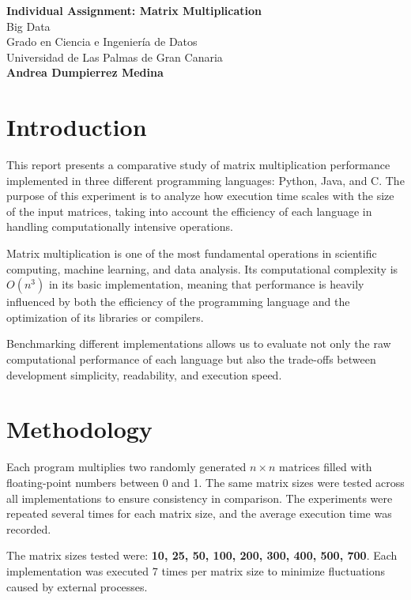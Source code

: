 \documentclass[a4paper,12pt]{article}
\begin{document}
\begin{titlepage}
    \centering
    \vspace*{3cm}
    {\Large\textbf{Individual Assignment: Matrix Multiplication}}\\[1cm]
    {\large Big Data}\\[0.5cm]
    {\large Grado en Ciencia e Ingeniería de Datos}\\[0.3cm]
    {\large Universidad de Las Palmas de Gran Canaria}\\[2cm]
    \textbf{Andrea Dumpierrez Medina}\\[0.5cm]
    \vfill
\end{titlepage}

\section*{Introduction}

This report presents a comparative study of matrix multiplication performance implemented in three different programming languages: Python, Java, and C. The purpose of this experiment is to analyze how execution time scales with the size of the input matrices, taking into account the efficiency of each language in handling computationally intensive operations.

Matrix multiplication is one of the most fundamental operations in scientific computing, machine learning, and data analysis. Its computational complexity is $O(n^3)$ in its basic implementation, meaning that performance is heavily influenced by both the efficiency of the programming language and the optimization of its libraries or compilers.

Benchmarking different implementations allows us to evaluate not only the raw computational performance of each language but also the trade-offs between development simplicity, readability, and execution speed.

\section*{Methodology}

Each program multiplies two randomly generated $n \times n$ matrices filled with floating-point numbers between 0 and 1. The same matrix sizes were tested across all implementations to ensure consistency in comparison. The experiments were repeated several times for each matrix size, and the average execution time was recorded.

The matrix sizes tested were: \textbf{10, 25, 50, 100, 200, 300, 400, 500, 700}.  
Each implementation was executed 7 times per matrix size to minimize fluctuations caused by external processes.
\end{document}
